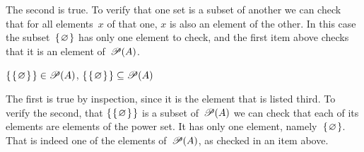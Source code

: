 \documentclass{ibl}  %
\begin{document}
\begin{problem}
\begin{exes}
\begin{answer}
  The second is true.
  To verify that one set is a subset of another we can check that for all
  elements~$x$ of that one, $x$ is also an element of the other.
  In this case the subset~$\mbox{$\{\hspace{0.1em}\varnothing\hspace{0.1em}\}$}$ has only one element to check,
  and the first item above checks that it is an element of~$\mathscr{P}(A)$.
\end{answer}
\begin{exercise} 
  $\mbox{$\{\hspace{0.1em}\mbox{$\{\hspace{0.1em}\varnothing\hspace{0.1em}\}$}\hspace{0.1em}\}$}\in\mathscr{P}(A)$,    
  $\mbox{$\{\hspace{0.1em}\mbox{$\{\hspace{0.1em}\varnothing\hspace{0.1em}\}$}\hspace{0.1em}\}$}\subseteq\mathscr{P}(A)$    
\end{exercise}
\begin{answer}
  The first is true by inspection, since it is the element that is listed
  third.
  To verify the second,
  that $\mbox{$\{\hspace{0.1em}\mbox{$\{\hspace{0.1em}\varnothing\hspace{0.1em}\}$}\hspace{0.1em}\}$}$ is a subset of~$\mathscr{P}(A)$
  we can check that each of its elements are elements of the power set.
  It has only one element, namely~$\mbox{$\{\hspace{0.1em}\varnothing\hspace{0.1em}\}$}$.
  That is indeed one of the elements of~$\mathscr{P}(A)$, as checked in 
  an item above.   
\end{answer}
\end{exes}




\end{problem}
\end{document}
